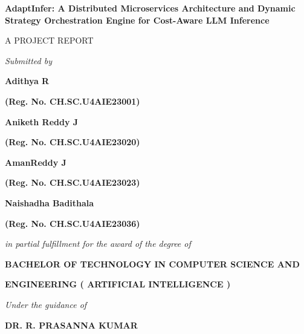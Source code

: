 \documentclass[12pt,a4paper]{report}
\begin{document}
\begin{titlepage}
\begin{center}
    \vspace*{1.0cm}
    {\large \textbf{AdaptInfer: A Distributed Microservices Architecture and Dynamic Strategy Orchestration Engine for Cost-Aware LLM Inference}\par}
    \vspace{0.8cm}
    {\normalsize A PROJECT REPORT\par}
    \vspace{0.6cm}
    {\normalsize \textit{Submitted by}\par}
    \vspace{0.4cm}
    {\normalsize \textbf{Adithya R}\par}
    {\normalsize \textbf{(Reg. No. CH.SC.U4AIE23001)}\par}
    \vspace{0.25cm}
    {\normalsize \textbf{Aniketh Reddy J}\par}
    {\normalsize \textbf{(Reg. No. CH.SC.U4AIE23020)}\par}
    \vspace{0.25cm}
    {\normalsize \textbf{AmanReddy J}\par}
    {\normalsize \textbf{(Reg. No. CH.SC.U4AIE23023)}\par}
    \vspace{0.25cm}
    {\normalsize \textbf{Naishadha Badithala}\par}
    {\normalsize \textbf{(Reg. No. CH.SC.U4AIE23036)}\par}
    \vspace{0.7cm}
    {\normalsize \textit{in partial fulfillment for the award of the degree of}\par}
    \vspace{0.35cm}
    {\normalsize \textbf{BACHELOR OF TECHNOLOGY IN COMPUTER SCIENCE AND}\par}
    {\normalsize \textbf{ENGINEERING ( ARTIFICIAL INTELLIGENCE )}\par}
    \vspace{0.6cm}
    {\normalsize \textit{Under the guidance of}\par}
    \vspace{0.25cm}
    {\normalsize \textbf{DR. R. PRASANNA KUMAR}\par}
    \vspace{0.55cm}

\end{center}
\end{titlepage}
\end{document}
